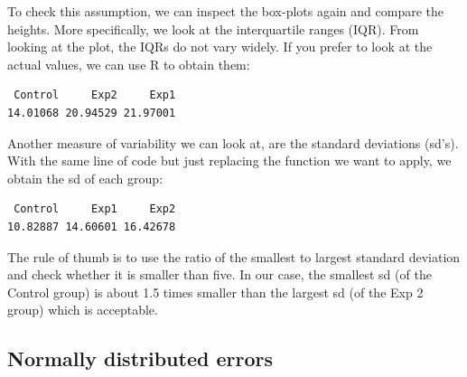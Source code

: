 \documentclass[
  letterpaper,
]{book}
\newenvironment{Shaded}{\begin{snugshade}}{\end{snugshade}}
\newcommand{\FunctionTok}[1]{\textcolor[rgb]{0.28,0.35,0.67}{#1}}
\newcommand{\NormalTok}[1]{\textcolor[rgb]{0.00,0.23,0.31}{#1}}
\newcommand{\SpecialCharTok}[1]{\textcolor[rgb]{0.37,0.37,0.37}{#1}}
\begin{document}
To check this assumption, we can inspect the box-plots again and compare
the heights. More specifically, we look at the interquartile ranges
(IQR). From looking at the plot, the IQRs do not vary widely. If you
prefer to look at the actual values, we can use R to obtain them:

\begin{Shaded}
\end{Shaded}

\begin{verbatim}
 Control     Exp2     Exp1 
14.01068 20.94529 21.97001 
\end{verbatim}

Another measure of variability we can look at, are the standard
deviations (sd's). With the same line of code but just replacing the
function we want to apply, we obtain the sd of each group:

\begin{Shaded}
\end{Shaded}

\begin{verbatim}
 Control     Exp1     Exp2 
10.82887 14.60601 16.42678 
\end{verbatim}

The rule of thumb is to use the ratio of the smallest to largest
standard deviation and check whether it is smaller than five. In our
case, the smallest sd (of the Control group) is about 1.5 times smaller
than the largest sd (of the Exp 2 group) which is acceptable.

\subsection*{Normally distributed
errors}\label{normally-distributed-errors}
\end{document}
